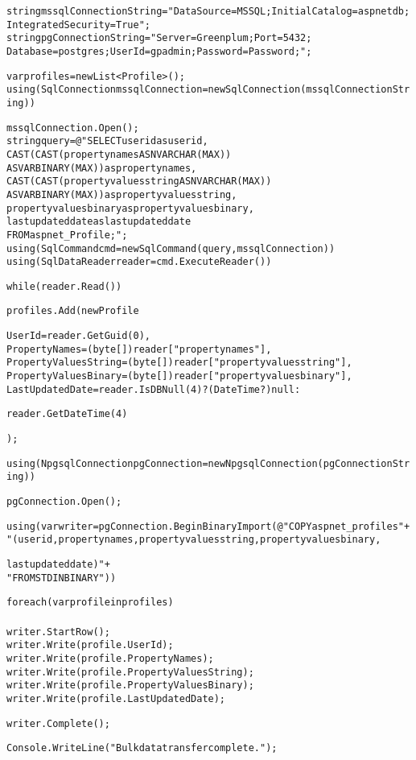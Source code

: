 \begin{mdframed}[backgroundcolor=white, linecolor=black, roundcorner=5pt]
\begin{alltt}
string mssqlConnectionString = "Data Source=MSSQL;Initial Catalog=aspnetdb;
                                Integrated Security=True";
string pgConnectionString = "Server=Greenplum;Port=5432;
                            Database=postgres;User Id=gpadmin;Password=Password;";

var profiles = new List<Profile>();
using (SqlConnection mssqlConnection = new SqlConnection(mssqlConnectionString))
{
    mssqlConnection.Open();
    string query = @"SELECT userid as userid,
                    CAST(CAST(propertynames AS NVARCHAR(MAX)) 
                    AS VARBINARY(MAX)) as propertynames,
                    CAST(CAST(propertyvaluesstring AS NVARCHAR(MAX)) 
                    AS VARBINARY(MAX)) as propertyvaluesstring,
                    propertyvaluesbinary as propertyvaluesbinary,
                    lastupdateddate as lastupdateddate
                    FROM aspnet_Profile;";
    using (SqlCommand cmd = new SqlCommand(query, mssqlConnection))
    using (SqlDataReader reader = cmd.ExecuteReader())
    {
        while (reader.Read())
        {
            profiles.Add(new Profile
            {
                UserId = reader.GetGuid(0),
                PropertyNames = (byte[])reader["propertynames"],
                PropertyValuesString = (byte[])reader["propertyvaluesstring"],
                PropertyValuesBinary = (byte[])reader["propertyvaluesbinary"],
                LastUpdatedDate = reader.IsDBNull(4) ? (DateTime?)null : 
                
                reader.GetDateTime(4)
            });
        }
    }
}

using (NpgsqlConnection pgConnection = new NpgsqlConnection(pgConnectionString))
{
    pgConnection.Open();

    using (var writer = pgConnection.BeginBinaryImport(@"COPY aspnet_profiles " +
        "(userid, propertynames, propertyvaluesstring, propertyvaluesbinary, 
        
        lastupdateddate)" +
        " FROM STDIN BINARY"))
    {
        foreach (var profile in profiles)
        {
            writer.StartRow();
            writer.Write(profile.UserId);
            writer.Write(profile.PropertyNames);
            writer.Write(profile.PropertyValuesString);
            writer.Write(profile.PropertyValuesBinary);
            writer.Write(profile.LastUpdatedDate);
        }

        writer.Complete();
    }
}

Console.WriteLine("Bulk data transfer complete.");
\end{alltt}
\end{mdframed}


